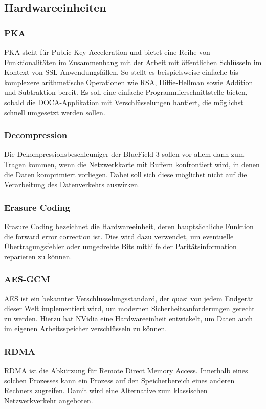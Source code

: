 \subsection{Hardwareeinheiten}
\subsubsection{PKA}
PKA steht für Public-Key-Acceleration und bietet eine Reihe von Funktionalitäten im Zusammenhang mit der Arbeit mit öffentlichen Schlüsseln im Kontext von SSL-Anwendungsfällen. So stellt es beispielsweise einfache bis komplexere arithmetische Operationen wie RSA, Diffie-Hellman sowie Addition und Subtraktion bereit. Es soll eine einfache Programmierschnittstelle bieten, sobald die DOCA-Applikation mit Verschlüsselungen hantiert, die möglichst schnell umgesetzt werden sollen.
\subsubsection{Decompression}
Die Dekompressionsbeschleuniger der BlueField-3 sollen vor allem dann zum Tragen kommen, wenn die Netzwerkkarte mit Buffern konfrontiert wird, in denen die Daten komprimiert vorliegen. Dabei soll sich diese möglichst nicht auf die Verarbeitung des Datenverkehrs auswirken.
\subsubsection{Erasure Coding}
Erasure Coding bezeichnet die Hardwareeinheit, deren hauptsächliche Funktion die forward error correction ist. Dies wird dazu verwendet, um eventuelle Übertragungsfehler oder umgedrehte Bits mithilfe der Paritätsinformation reparieren zu können.
\subsubsection{AES-GCM}
AES ist ein bekannter Verschlüsselungsstandard, der quasi von jedem Endgerät dieser Welt implementiert wird, um modernen Sicherheitsanforderungen gerecht zu werden. Hierzu hat NVidia eine Hardwareeinheit entwickelt, um Daten auch im eigenen Arbeitsspeicher verschlüsseln zu können.
\subsubsection{RDMA}
RDMA ist die Abkürzung für Remote Direct Memory Access. Innerhalb eines solchen Prozesses kann ein Prozess auf den Speicherbereich eines anderen Rechners zugreifen. Damit wird eine Alternative zum klassischen Netzwerkverkehr angeboten.
